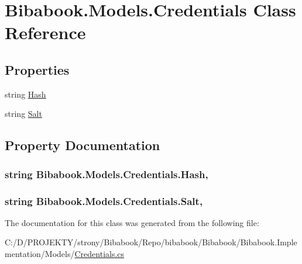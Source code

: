 \hypertarget{class_bibabook_1_1_models_1_1_credentials}{}\section{Bibabook.\+Models.\+Credentials Class Reference}
\label{class_bibabook_1_1_models_1_1_credentials}
\subsection*{Properties}
\begin{DoxyCompactItemize}
\item 
string \hyperlink{class_bibabook_1_1_models_1_1_credentials_a421d73ded384ad9674a18de43c5ff4e9}{Hash}
\item 
string \hyperlink{class_bibabook_1_1_models_1_1_credentials_a3f82995e88593c4c765d54f2e3c44e7d}{Salt}
\end{DoxyCompactItemize}


\subsection{Property Documentation}
\hypertarget{class_bibabook_1_1_models_1_1_credentials_a421d73ded384ad9674a18de43c5ff4e9}{}
\subsubsection[{Hash}]{\setlength{\rightskip}{0pt plus 5cm}string Bibabook.\+Models.\+Credentials.\+Hash\hspace{0.3cm}{\ttfamily [get]}, {\ttfamily [set]}}\label{class_bibabook_1_1_models_1_1_credentials_a421d73ded384ad9674a18de43c5ff4e9}
\hypertarget{class_bibabook_1_1_models_1_1_credentials_a3f82995e88593c4c765d54f2e3c44e7d}{}
\subsubsection[{Salt}]{\setlength{\rightskip}{0pt plus 5cm}string Bibabook.\+Models.\+Credentials.\+Salt\hspace{0.3cm}{\ttfamily [get]}, {\ttfamily [set]}}\label{class_bibabook_1_1_models_1_1_credentials_a3f82995e88593c4c765d54f2e3c44e7d}


The documentation for this class was generated from the following file\+:\begin{DoxyCompactItemize}
\item 
C\+:/\+D/\+P\+R\+O\+J\+E\+K\+T\+Y/strony/\+Bibabook/\+Repo/bibabook/\+Bibabook/\+Bibabook.\+Implementation/\+Models/\hyperlink{_credentials_8cs}{Credentials.\+cs}\end{DoxyCompactItemize}
